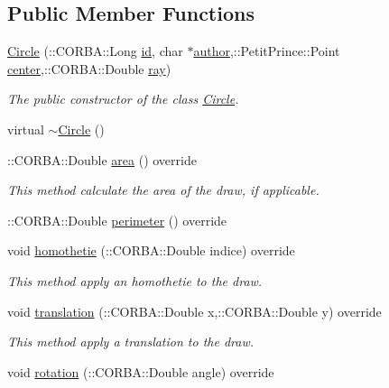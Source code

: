 \subsection*{Public Member Functions}
\begin{DoxyCompactItemize}
\item 
\hyperlink{class_circle_a2fa6fdcd4c23644df468dfa48c519611}{Circle} (\+::C\+O\+R\+B\+A\+::\+Long \hyperlink{class_draw_a1bf27c5a59da9002d55936c947dce2cc}{id}, char $\ast$\hyperlink{class_draw_a4781c654db63e069c8c5be017f6ccc34}{author},\+::Petit\+Prince\+::\+Point \hyperlink{class_circle_a3c50bcfe91b3c635a92bdab41a52c8b6}{center},\+::C\+O\+R\+B\+A\+::\+Double \hyperlink{class_circle_ac5d62ae3368cd16552b77454095bb618}{ray})
\begin{DoxyCompactList}\small\item\em The public constructor of the class \hyperlink{class_circle}{Circle}. \end{DoxyCompactList}\item 
virtual \hyperlink{class_circle_ad02555ca63f3574193b958c49f81d178}{$\sim$\+Circle} ()
\item 
\+::C\+O\+R\+B\+A\+::\+Double \hyperlink{class_circle_a1bed1e5042fa7021ed397334ea2e4338}{area} () override
\begin{DoxyCompactList}\small\item\em This method calculate the area of the draw, if applicable. \end{DoxyCompactList}\item 
\+::C\+O\+R\+B\+A\+::\+Double \hyperlink{class_circle_a17053c2408a3f9e951531ec11722c06a}{perimeter} () override
\item 
void \hyperlink{class_circle_a288221daec16e6d4b0b5b0816935451b}{homothetie} (\+::C\+O\+R\+B\+A\+::\+Double indice) override
\begin{DoxyCompactList}\small\item\em This method apply an homothetie to the draw. \end{DoxyCompactList}\item 
void \hyperlink{class_circle_ad7aed2e09cb4cf0f370d8cc137a6e4ea}{translation} (\+::C\+O\+R\+B\+A\+::\+Double x,\+::C\+O\+R\+B\+A\+::\+Double y) override
\begin{DoxyCompactList}\small\item\em This method apply a translation to the draw. \end{DoxyCompactList}\item 
void \hyperlink{class_circle_acf614416a1269c430cf180fe78ffb1c4}{rotation} (\+::C\+O\+R\+B\+A\+::\+Double angle) override

\end{DoxyCompactItemize}
